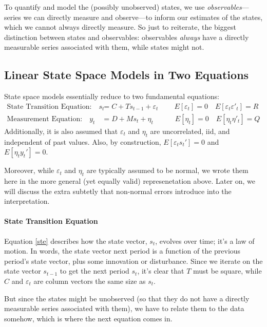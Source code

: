 \documentclass[a4paper,12pt]{article}
\begin{document}
To quantify and model the (possibly unobserved) states, we use \emph{observables}---series we can directly measure and observe---to inform our estimates of the states, which we cannot always directly measure. So just to reiterate, the biggest distinction between states and observables: observables \emph{always} have a directly measurable series associated with them, while states might not.


\subsection{Linear State Space Models in Two Equations}

State space models essentially reduce to two fundamental equations:
\begin{align}
  \text{State Transition Equation:} \quad
    s_{t} &= C + T s_{t-1} + \varepsilon_{t} \label{ste}\
    \quad\quad E[\varepsilon_t] = 0
    \quad E[\varepsilon_t \varepsilon'_t] =  R \\
  \text{Measurement Equation:} \quad
    y_{t} &= D + M s_{t} + \eta_{t} \label{moe}
    \quad\qquad E[\eta_t] =  0 
    \quad E[\eta_t \eta'_t] =  Q 
\end{align}
Additionally, it is also assumed that $\varepsilon_t$ and
$\eta_t$ are uncorrelated, iid, and independent of past
values. Also, by construction, $E[\varepsilon_t s_t']=0$
and $E[\eta_t y_t']=0$.

Moreover, while $\varepsilon_t$ and $\eta_t$ are typically assumed to be normal, we wrote them here in the more general (yet equally valid) represenetation above. Later on, we will discuss the extra subtetly that non-normal errors introduce into the interpretation.


\paragraph{State Transition Equation} Equation \ref{ste} describes how the state vector, $s_t$, evolves over time; it's a law of motion. In words, the state vector next period is a function of the previous period's state vector, plus some innovation or disturbance.  Since we iterate on the state vector $s_{t-1}$ to get the next period $s_{t}$, it's clear that $T$ must be square, while $C$ and $\varepsilon_t$ are column vectors the same size as $s_t$.

But since the states might be unobserved (so that they do not have a directly measurable series associated with them), we have to relate them to the data somehow, which is where the next equation comes in.
\end{document}
